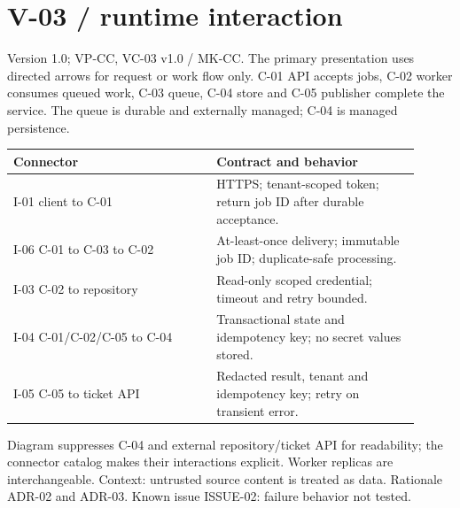 \documentclass[11pt,letterpaper]{article}
\newcommand{\docsection}[1]{\Needspace{5\baselineskip}\section{#1}}
\begin{document}
\docsection{V-03 / runtime interaction}
Version 1.0; VP-CC, VC-03 v1.0 / MK-CC. The primary presentation uses directed arrows for request or work flow only. C-01 API accepts jobs, C-02 worker consumes queued work, C-03 queue, C-04 store and C-05 publisher complete the service. The queue is durable and externally managed; C-04 is managed persistence.

\begin{center}\end{center}
\begin{longtable}{@{}>{\RaggedRight\arraybackslash}p{0.457\linewidth}>{\RaggedRight\arraybackslash}p{0.457\linewidth}@{}}
\toprule
\textbf{Connector} & \textbf{Contract and behavior}\\\midrule
\endhead
I-01 client to C-01 & HTTPS; tenant-scoped token; return job ID after durable acceptance.\\
I-06 C-01 to C-03 to C-02 & At-least-once delivery; immutable job ID; duplicate-safe processing.\\
I-03 C-02 to repository & Read-only scoped credential; timeout and retry bounded.\\
I-04 C-01/C-02/C-05 to C-04 & Transactional state and idempotency key; no secret values stored.\\
I-05 C-05 to ticket API & Redacted result, tenant and idempotency key; retry on transient error.\\
\bottomrule
\end{longtable}
Diagram suppresses C-04 and external repository/ticket API for readability; the connector catalog makes their interactions explicit. Worker replicas are interchangeable. Context: untrusted source content is treated as data. Rationale ADR-02 and ADR-03. Known issue ISSUE-02: failure behavior not tested.
\end{document}
